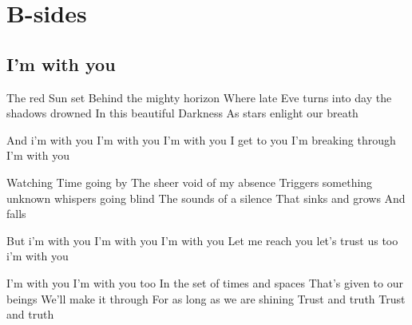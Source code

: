 \documentclass{article}
\newenvironment{album}[1]%
{%
  \section*{#1}
}%
{%
}
\newenvironment{song}[1]%
{%
  \subsection*{\textbf{#1}}
  \begin{multicols*}{2}
}%
{%
  \end{multicols*}
  \newpage
}
\newenvironment{couplet} %
{%
  \verbatim
}%
{% end code
  \endverbatim
}
\newenvironment{refrain} %
{%
  \verbatim
}%
{% end code
  \endverbatim
}
\begin{document}
\begin{album}{B-sides}
\begin{song}{I'm with you}
\begin{couplet}
The red Sun set
Behind the mighty horizon
Where late Eve turns into day
the shadows drowned
In this beautiful Darkness
As stars enlight our breath  
\end{couplet}
\begin{refrain}
And i'm with you
I'm with you
I'm with you
I get to you
I'm breaking through
I'm with you
\end{refrain}
\begin{couplet}
Watching Time going by
The sheer void of my absence
Triggers something unknown
whispers going blind
The sounds of a silence
That sinks and grows 
And falls
\end{couplet}
\begin{refrain}
But i'm with you
I'm with you
I'm with you
Let me reach you
let's trust us too
i'm with you
\end{refrain}
\begin{refrain}
I'm with you
I'm with you too
In the set of times and spaces
That's given to our beings
We'll make it through
For as long as we are shining
Trust and truth
Trust and truth
\end{refrain}
\end{song}


\end{album}
\end{document}
